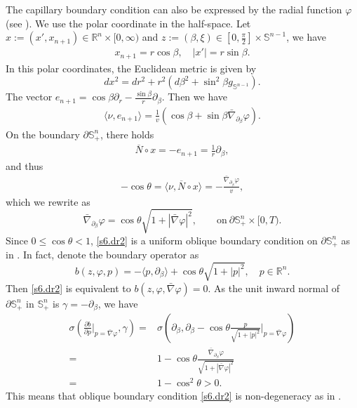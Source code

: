 \documentclass[11pt,reqno]{amsart}
\theoremstyle{definition}
\theoremstyle{remark}
\numberwithin{equation}{section}
\renewcommand{\(}{\left(}
\renewcommand{\)}{\right)}
\renewcommand{\-}{\overline}
\renewcommand{\b}{\beta}
\renewcommand{\t}{\theta}
\begin{document}
The capillary boundary condition can also be expressed by the radial function $\varphi$ (see \cite[\S 4.1]{Wang-Weng-Xia2022}). We use the polar coordinate in the half-space. Let $x:=(x',x_{n+1})\in \mathbb R^n\times [0,\infty)$ and $z:=(\b,\xi)\in [0,\frac{\pi}{2}]\times \mathbb S^{n-1}$, we have
\begin{align*}
x_{n+1}=r\cos\b, \quad |x'|=r\sin\b.
\end{align*}
In this polar coordinates, the Euclidean metric is given by
$$
dx^2=dr^2+r^2(d\b^2+\sin^2\b g_{\mathbb S^{n-1}}).
$$
The vector $e_{n+1}=\cos\b \partial_r-\frac{\sin\b}{r}\partial_\b$.  Then we have
\begin{align*}
\langle \nu,e_{n+1}\rangle=\frac{1}{v}(\cos\b+\sin\b \bar{\nabla}_{\partial_\b}\varphi).
\end{align*}
On the boundary $\partial \mathbb S_{+}^n$, there holds
\begin{align*}
\-N \circ x=-e_{n+1}=\frac{1}{r}\partial_\b,
\end{align*}
and thus
\begin{align*}
-\cos\t =\langle \nu, \-N\circ x\rangle=-\frac{\bar{\nabla}_{\partial_\b} \varphi}{v},
\end{align*}
which we rewrite as
\begin{equation}\label{s6.dr2}
  \bar{\nabla}_{\partial_\beta}\varphi=\cos\theta \sqrt{1+|\bar{\nabla}\varphi|^2},\qquad \mathrm{on}~\partial\mathbb S_+^n \times [0,T).
\end{equation}
Since $0\leq \cos\t<1$, \eqref{s6.dr2} is  a uniform oblique boundary condition on $\partial\mathbb S_+^n$ as in \cite{Ural1991}. In fact, denote the boundary operator as
\begin{equation*}
  b(z,\varphi,p)=-\langle p,\partial_\beta\rangle +\cos\theta \sqrt{1+|p|^2},\quad p\in \mathbb{R}^n.
\end{equation*}
 Then \eqref{s6.dr2} is equivalent to $b(z,\varphi,\bar{\nabla}\varphi)=0$. As the unit inward normal of $\partial \mathbb S_{+}^n$ in $\mathbb S_{+}^n$ is $\gamma=-\partial_\beta$,  we have
 \begin{align*}
\sigma\left( \frac{\partial b}{\partial p}\Big|_{p=\bar{\nabla}\varphi}, \gamma\right)= &\sigma\left( \partial_\beta, \partial_\beta-\cos\theta \frac{p}{\sqrt{1+|p|^2}}\Big|_{p=\bar{\nabla}\varphi}\right)  \\
  =  & 1-\cos\theta \frac{\bar{\nabla}_{\partial_\beta}\varphi}{\sqrt{1+|\bar{\nabla}\varphi|^2}}\\
  =&1-\cos^2\theta>0.
 \end{align*}
 This means that oblique boundary condition \eqref{s6.dr2} is non-degeneracy as in \cite{Ural1991}.
\end{document}
